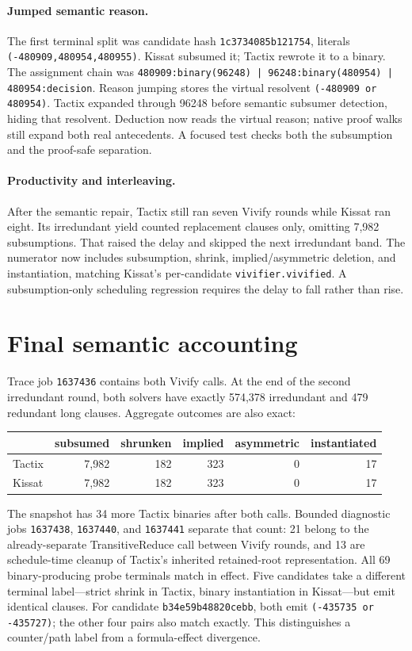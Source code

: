 \documentclass[11pt]{article}
\newcommand{\code}[1]{\texttt{#1}}
\begin{document}
\paragraph{Jumped semantic reason.}
The first terminal split was candidate hash \code{1c3734085b121754}, literals
\code{(-480909,480954,480955)}.  Kissat subsumed it; Tactix rewrote it to a
binary.  The assignment chain was
\code{480909:binary(96248) | 96248:binary(480954) | 480954:decision}.
Reason jumping stores the virtual resolvent
\code{(-480909 or 480954)}.  Tactix expanded through 96248 before semantic
subsumer detection, hiding that resolvent.  Deduction now reads the virtual
reason; native proof walks still expand both real antecedents.  A focused test
checks both the subsumption and the proof-safe separation.

\paragraph{Productivity and interleaving.}
After the semantic repair, Tactix still ran seven Vivify rounds while Kissat
ran eight.  Its irredundant yield counted replacement clauses only, omitting
7,982 subsumptions.  That raised the delay and skipped the next irredundant
band.  The numerator now includes subsumption, shrink, implied/asymmetric
deletion, and instantiation, matching Kissat's per-candidate
\code{vivifier.vivified}.  A subsumption-only scheduling regression requires
the delay to fall rather than rise.

\section*{Final semantic accounting}
Trace job \code{1637436} contains both Vivify calls.  At the end of the second
irredundant round, both solvers have exactly 574,378 irredundant and 479
redundant long clauses.  Aggregate outcomes are also exact:

\begin{center}
\begin{tabular}{lrrrrr}
\toprule
 & subsumed & shrunken & implied & asymmetric & instantiated \\
\midrule
Tactix & 7,982 & 182 & 323 & 0 & 17 \\
Kissat & 7,982 & 182 & 323 & 0 & 17 \\
\bottomrule
\end{tabular}
\end{center}

The snapshot has 34 more Tactix binaries after both calls.  Bounded diagnostic
jobs \code{1637438}, \code{1637440}, and \code{1637441} separate that count:
21 belong to the already-separate TransitiveReduce call between Vivify rounds,
and 13 are schedule-time cleanup of Tactix's inherited retained-root
representation.  All 69 binary-producing probe terminals match in effect.
Five candidates take a different terminal label---strict shrink in Tactix,
binary instantiation in Kissat---but emit identical clauses.  For candidate
\code{b34e59b48820cebb}, both emit
\code{(-435735 or -435727)}; the other four pairs also match exactly.  This
distinguishes a counter/path label from a formula-effect divergence.
\end{document}
